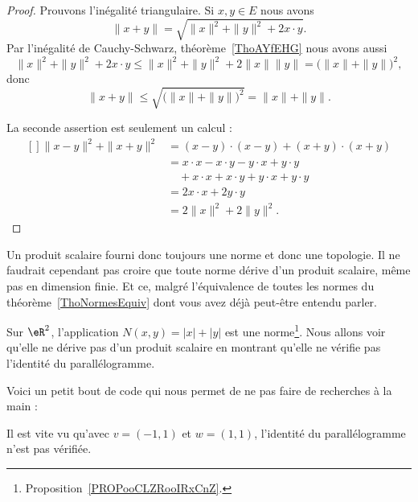 \begin{proof}
    Prouvons l'inégalité triangulaire. Si \( x,y\in E\) nous avons
    \begin{equation}
        \| x+y \|=\sqrt{\| x \|^2+\| y \|^2+2x\cdot y}.
    \end{equation}
    Par l'inégalité de Cauchy-Schwarz, théorème~\ref{ThoAYfEHG} nous avons aussi
    \begin{equation}
        \| x \|^2+\| y \|^2+2x\cdot y\leq \| x \|^2+\| y \|^2+2\| x \|\| y \|=\big( \| x \|+\| y \| \big)^2,
    \end{equation}
    donc
    \begin{equation}
        \| x+y \|\leq \sqrt{\big( \| x \|+\| y \| \big)^2}=\| x \|+\| y \|.
    \end{equation}

    La seconde assertion est seulement un calcul :
			\begin{equation}
				\begin{aligned}[]
					\| x-y \|^2+\| x+y \|^2&=(x-y)\cdot (x-y)+(x+y)\cdot(x+y)\\
					&=x\cdot x-x\cdot y-y\cdot x+y\cdot y\\
					&\quad +x\cdot x+x\cdot y+y\cdot x+y\cdot y\\
					&=2x\cdot x+2y\cdot y\\
					&=2\| x \|^2+2\| y \|^2.
				\end{aligned}
			\end{equation}
\end{proof}

\begin{normaltext}
    Un produit scalaire fourni donc toujours une norme et donc une topologie. Il ne faudrait cependant pas croire que toute norme dérive d'un produit scalaire, même pas en dimension finie. Et ce, malgré l'équivalence de toutes les normes du théorème~\ref{ThoNormesEquiv} dont vous avez déjà peut-être entendu parler.
\end{normaltext}

\begin{example}     \label{EXooCAPYooMgOSyH}
    Sur \( \eR^2\), l'application \( N(x,y)=| x |+| y |\) est une norme\footnote{Proposition~\ref{PROPooCLZRooIRxCnZ}.}. Nous allons voir qu'elle ne dérive pas d'un produit scalaire en montrant qu'elle ne vérifie pas l'identité du parallélogramme.

    Voici un petit bout de code qui nous permet de ne pas faire de recherches à la main :
    

    Il est vite vu qu'avec \( v=(-1,1)\) et \( w=(1,1)\), l'identité du parallélogramme n'est pas vérifiée.
\end{example}

